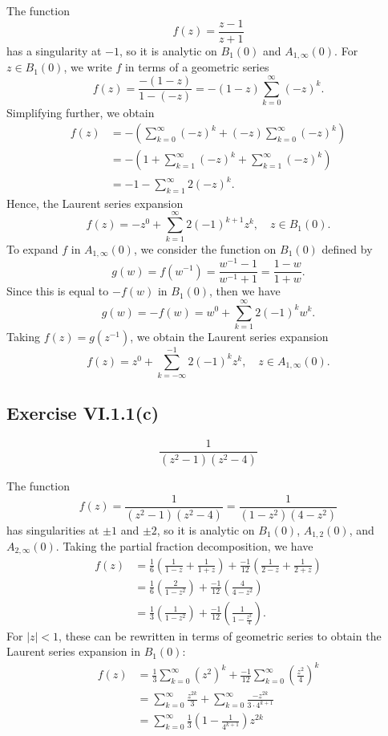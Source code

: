 \documentclass[12pt]{article}
\newenvironment{problem}
    {\begin{lrbox}{\mybox}\begin{minipage}{0.98\textwidth}}
    {\end{minipage}\end{lrbox}\begin{center}\framebox[\textwidth]{\usebox{\mybox}}\end{center}}
\theoremstyle{definition}
\begin{document}
The function
\[
    f(z) = \frac{z - 1}{z + 1}
\]
has a singularity at $-1$, so it is analytic on $B_1(0)$ and $A_{1,\infty}(0)$. For $z \in B_1(0)$, we write $f$ in terms of a geometric series
\[
    f(z) = \frac{-(1 - z)}{1 - (-z)} = -(1 - z)\sum_{k=0}^\infty (-z)^k.
\]
Simplifying further, we obtain
\begin{align*}
    f(z)
        &= -\left(\sum_{k=0}^\infty (-z)^k + (-z)\sum_{k=0}^\infty (-z)^k\right) \\
        &= -\left(1 + \sum_{k=1}^\infty (-z)^k + \sum_{k=1}^\infty (-z)^k\right) \\
        &= -1 - \sum_{k=1}^\infty 2(-z)^k.
\end{align*}
Hence, the Laurent series expansion
\[
    f(z) = -z^0 + \sum_{k=1}^\infty 2(-1)^{k+1} z^k, \quad z \in B_1(0).
\]
To expand $f$ in $A_{1,\infty}(0)$, we consider the function on $B_1(0)$ defined by
\[
    g(w) = f(w^{-1}) = \frac{w^{-1} - 1}{w^{-1} + 1} = \frac{1 - w}{1 + w}.
\]
Since this is equal to $-f(w)$ in $B_1(0)$, then we have
\[
    g(w) = -f(w) = w^0 + \sum_{k=1}^\infty 2(-1)^k w^k.
\]
Taking $f(z) = g(z^{-1})$, we obtain the Laurent series expansion
\[
    f(z) = z^0 + \sum_{k=-\infty}^{-1} 2(-1)^k z^k, \quad z \in A_{1,\infty}(0).
\]


\subsection{Exercise VI.1.1(c)}
\begin{problem}
    \[
        \frac{1}{(z^2 -1)(z^2 - 4)}
    \]
\end{problem}

The function
\[
    f(z) = \frac{1}{(z^2 -1)(z^2 - 4)} = \frac{1}{(1 - z^2)(4 - z^2)}
\]
has singularities at $\pm1$ and $\pm2$, so it is analytic on $B_1(0)$, $A_{1,2}(0)$, and $A_{2,\infty}(0)$. Taking the partial fraction decomposition, we have
\begin{align*}
    f(z)
        &= \frac16\left(\frac{1}{1-z} + \frac{1}{1+z}\right) + \frac{-1}{12}\left(\frac{1}{2-z} + \frac{1}{2+z}\right) \\
        &= \frac16\left(\frac{2}{1-z^2}\right) + \frac{-1}{12}\left(\frac{4}{4-z^2}\right) \\
        &= \frac13\left(\frac{1}{1-z^2}\right) + \frac{-1}{12}\left(\frac{1}{1-\frac{z^2}{4}}\right).
\end{align*}
For $|z| < 1$, these can be rewritten in terms of geometric series to obtain the Laurent series expansion in $B_1(0)$:
\begin{align*}
    f(z)
        &= \frac13 \sum_{k=0}^\infty (z^2)^k + \frac{-1}{12} \sum_{k=0}^\infty \left(\frac{z^2}{4}\right)^k \\
        &= \sum_{k=0}^\infty \frac{z^{2k}}{3}  + \sum_{k=0}^\infty \frac{-z^{2k}}{3 \cdot 4^{k+1}} \\
        &= \sum_{k=0}^\infty \frac{1}{3}\left(1  - \frac{1}{4^{k+1}}\right)z^{2k}
\end{align*}
\end{document}

